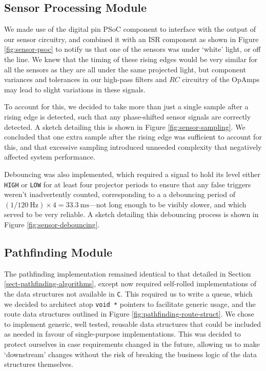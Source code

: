 \documentclass[conference]{IEEEtran}
\begin{document}
\subsection{Sensor Processing Module}

We made use of the digital pin PSoC component to interface with the output of our sensor circuitry, and combined it with an ISR component as shown in Figure \ref{fig:sensor-psoc} to notify us that one of the sensors was under `white' light, or off the line.
We knew that the timing of these rising edges would be very similar for all the sensors as they are all under the same projected light, but component variances and tolerances in our high-pass filters and $RC$ circuitry of the OpAmps may lead to slight variations in these signals.

To account for this, we decided to take more than just a single sample after a rising edge is detected, such that any phase-shifted sensor signals are correctly detected.
A sketch detailing this is shown in Figure \ref{fig:sensor-sampling}.
We concluded that one extra sample after the rising edge was sufficient to account for this, and that excessive sampling introduced unneeded complexity that negatively affected system performance.

Debouncing was also implemented, which required a signal to hold its level either \texttt{HIGH} or \texttt{LOW} for at least four projector periods to ensure that any false triggers weren't inadvertently counted, corresponding to a a debouncing period of $\left(1 / \qty{120}{\hertz}\right) \times 4 = \qty{33.3}{\ms}$—not long enough to be visibly slower, and which served to be very reliable.
A sketch detailing this debouncing process is shown in Figure \ref{fig:sensor-debouncing}.

\subsection{Pathfinding Module}

The pathfinding implementation remained identical to that detailed in Section \ref{sect-pathfinding-algorithms}, except now required self-rolled implementations of the data structures not available in \texttt{C}.
This required us to write a queue, which we decided to architect atop \texttt{void *} pointers to facilitate generic usage, and the route data structures outlined in Figure \ref{fig:pathfinding-route-struct}.
We chose to implement generic, well tested, reusable data structures that could be included as needed in favour of single-purpose implementations.
This was decided to protect ourselves in case requirements changed in the future, allowing us to make `downstream' changes without the risk of breaking the business logic of the data structures themselves.
\end{document}
